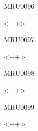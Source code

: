 \documentclass{article}
\begin{document}
\begin{corrige}{MRU0096}

<++>

\end{corrige}%


\begin{corrige}{MRU0097}

<++>

\end{corrige}%


\begin{corrige}{MRU0098}

<++>

\end{corrige}%


\begin{corrige}{MRU0099}

<++>

\end{corrige}%
\end{document}
